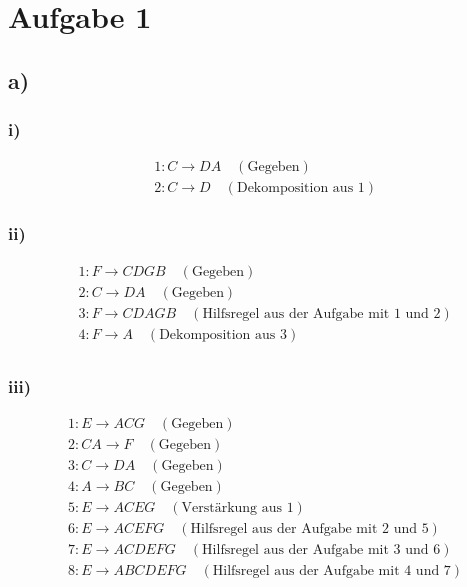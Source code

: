\pagebreak
\section*{Aufgabe 1}
\subsection*{a)}
\subsubsection*{i)}
\begin{align*}
&1: C \rightarrow DA\quad (\text{Gegeben})\\
&2: C \rightarrow D\quad (\text{Dekomposition aus 1})
\end{align*}
\subsubsection*{ii)}
\begin{align*}
&1: F \rightarrow CDGB\quad (\text{Gegeben})\\
&2: C \rightarrow DA\quad (\text{Gegeben})\\
&3: F \rightarrow CDAGB\quad (\text{Hilfsregel aus der Aufgabe mit 1 und 2})\\
&4: F \rightarrow A\quad (\text{Dekomposition aus 3})\\
\end{align*}
\subsubsection*{iii)}
\begin{align*}
&1: E \rightarrow ACG\quad (\text{Gegeben})\\
&2: CA \rightarrow F\quad (\text{Gegeben})\\
&3: C \rightarrow DA\quad (\text{Gegeben})\\
&4: A \rightarrow BC\quad (\text{Gegeben})\\
&5: E \rightarrow ACEG\quad (\text{Verstärkung aus 1})\\
&6: E \rightarrow ACEFG\quad (\text{Hilfsregel aus der Aufgabe mit 2 und 5})\\
&7: E \rightarrow ACDEFG\quad (\text{Hilfsregel aus der Aufgabe mit 3 und 6})\\
&8: E \rightarrow ABCDEFG\quad (\text{Hilfsregel aus der Aufgabe mit 4 und 7})\\
\end{align*}
